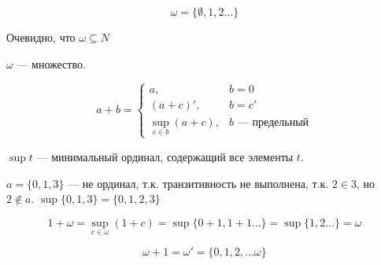 \begin{example}
    \[\omega = \{\emptyset, 1, 2 \dots \}\]

    Очевидно, что \(\omega \subseteq N\)
\end{example}
\begin{theorem}
    \(\omega\) --- множество.
\end{theorem}
\begin{definition}
    \[a + b = \begin{cases}
            a,                            & b = 0                    \\
            (a + c)',                     & b = c'                   \\
            \sup\limits_{c \in b}(a + c), & b \text{ --- предельный}
        \end{cases} \]
\end{definition}

\begin{definition}
    \(\sup t\) --- минимальный ординал, содержащий все элементы \(t\).
\end{definition}

\begin{example}
    \(a = \{0, 1, 3\}\) --- не ординал, т.к. транзитивность не выполнена, т.к. \(2 \in 3\), но \(2 \notin a\). \(\sup \{0, 1, 3\} = \{0, 1, 2, 3\} \)
\end{example}

\begin{example}
    \[1 + \omega = \sup_{c \in \omega} (1 + c) = \sup \{0 + 1, 1 + 1 \dots \} = \sup \{1, 2 \dots \} = \omega\]
\end{example}

\begin{example}
    \[\omega + 1 = \omega' = \{0, 1, 2, \dots \omega\}\]
\end{example}
